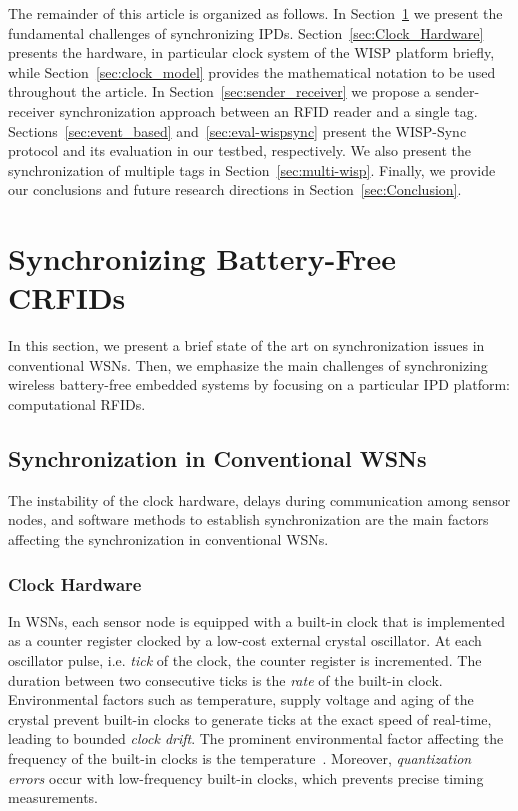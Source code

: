 \documentclass[10pt,journal,compsoc]{IEEEtran}
\begin{document}
The remainder of this article is organized as follows. In Section~\ref{sec:Related-Work} we present the fundamental challenges of synchronizing IPDs. Section~\ref{sec:Clock_Hardware} presents the hardware, in particular clock system of the WISP platform briefly, while Section~\ref{sec:clock_model} provides the mathematical notation to be used throughout the article. In 
Section~\ref{sec:sender_receiver} we propose a sender-receiver synchronization approach between an RFID reader and a single tag. Sections~\ref{sec:event_based} and~\ref{sec:eval-wispsync} present the WISP-Sync protocol and its evaluation in our testbed, respectively. We also present the synchronization of multiple tags in Section~\ref{sec:multi-wisp}. Finally, we provide our conclusions and future research directions in Section~\ref{sec:Conclusion}.  

\section{Synchronizing Battery-Free CRFIDs}
\label{sec:Related-Work}

In this section, we present a brief  state of the art on synchronization issues in conventional WSNs. Then, we emphasize the main challenges of synchronizing wireless battery-free embedded systems by focusing on a particular IPD platform: computational RFIDs. 

\subsection{Synchronization in Conventional WSNs}
\label{sec:WSN-Sync}

The instability of the clock hardware, delays during communication among sensor nodes, and software methods to establish synchronization are the main factors affecting the synchronization in conventional WSNs. 

\subsubsection{Clock Hardware}

In WSNs, each sensor node is equipped with a built-in clock that is implemented as a counter register clocked by a low-cost external crystal oscillator. At each oscillator pulse, i.e. \emph{tick} of the clock, the counter register is incremented. The duration between two consecutive ticks is the \emph{rate} of the built-in clock. Environmental factors such as temperature, supply voltage and aging of the crystal prevent built-in clocks to generate ticks at the exact speed of real-time, leading to bounded \emph{clock drift}. The prominent environmental factor affecting the frequency of the built-in clocks is the temperature~\cite{Schmid:2009,Schmid:2010}. Moreover, \emph{quantization errors} occur with low-frequency built-in clocks, which prevents precise timing measurements. 
\end{document}
